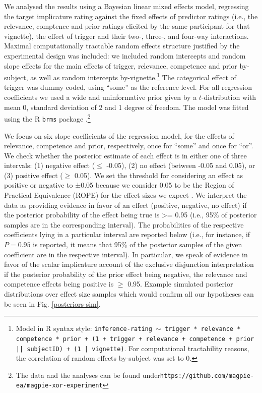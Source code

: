 \documentclass{sp}
\begin{document}
We analysed the results using a Bayesian linear mixed effects model, regressing the target implicature rating against the fixed effects of predictor ratings (i.e., the relevance, comptence and prior ratings elicited by the same participant for that vignette), the effect of trigger and their two-, three-, and four-way interactions. Maximal computationally tractable random effects structure justified by the experimental design was included: we included random intercepts and random slope effects for the main effects of trigger, relevance, competence and prior by-subject, as well as random intercepts by-vignette.\footnote{Model in R syntax style: \texttt{inference-rating $\sim$ trigger * relevance * competence * prior + (1 + trigger + relevance + competence + prior || subjectID) + (1 | vignette)}. For computational tractability reasons, the correlation of random effects by-subject was set to 0.}
The categorical effect of trigger was dummy coded, using ``some'' as the reference level. For all regression coefficients we used a wide and uninformative prior given by a $t$-distribution with mean 0, standard deviation of 2 and 1 degree of freedom. The model was fitted using the R \texttt{brms} package \citep{burkner2017brms}.\footnote{The data and the analyses can be found under\newline \texttt{https://github.com/magpie-ea/magpie-xor-experiment}}

We focus on six slope coefficients of the regression model, for the effects of relevance, competence and prior, respectively, once for ``some'' and once for ``or''. We check whether the posterior estimate of each effect is in either one of three intervals: (1) negative effect ($\le$ -0.05), (2) no effect (between -0.05 and 0.05), or (3) positive effect ($\ge$ 0.05). We set the threshold for considering an effect as positive or negative to ±0.05 because we consider 0.05 to be the Region of Practical Equivalence (ROPE) for the effect sizes we expect \citep{kruschke2014doing}.
We interpret the data as providing evidence in favor of an effect (positive, negative, no effect) if the posterior probability of the effect being true is >= 0.95 (i.e., 95\% of posterior samples are in the corresponding interval). The probabilities of the respective coefficients lying in a particular interval are reported below (i.e., for instance, if $P=0.95$ is reported, it means that 95\% of the posterior samples of the given coefficient are in the respective interval). In particular, we speak of evidence in favor of the scalar implicature account of the exclusive disjunction interpretation if the posterior probability of the prior effect being negative, the relevance and competence effects being positive is $\ge$ 0.95. Example simulated posterior distributions over effect size samples which would confirm all our hypotheses can be seen in Fig. \ref{posteriors-sim}.
\end{document}
